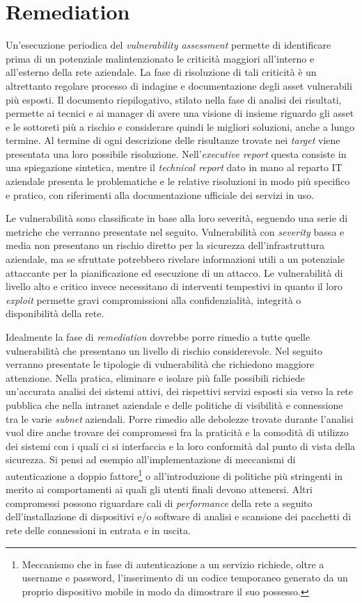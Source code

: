 \documentclass[target=bach,aauheader=]{thud}
\begin{document}
\section{Remediation}

Un’esecuzione periodica del \textit{vulnerability assessment} permette di identificare prima di un potenziale malintenzionato le criticità maggiori all’interno e all’esterno della rete aziendale. La fase di risoluzione di tali criticità è un altrettanto regolare processo di indagine e documentazione degli asset vulnerabili più esposti. Il documento riepilogativo, stilato nella fase di analisi dei risultati, permette ai tecnici e ai manager di avere una visione di insieme riguardo gli asset e le sottoreti più a rischio e considerare quindi le migliori soluzioni, anche a lungo termine. Al termine di ogni descrizione delle risultanze trovate nei \textit{target} viene presentata una loro possibile risoluzione. Nell’\textit{executive report} questa consiste in una spiegazione sintetica, mentre il \textit{technical report} dato in mano al reparto IT aziendale presenta le problematiche e le relative risoluzioni in modo più specifico e pratico, con riferimenti alla documentazione ufficiale dei servizi in uso.

Le vulnerabilità sono classificate in base alla loro severità, seguendo una serie di metriche che verranno presentate nel seguito. Vulnerabilità con \textit{severity} bassa e media non presentano un rischio diretto per la sicurezza dell’infrastruttura aziendale, ma se sfruttate potrebbero rivelare informazioni utili a un potenziale attaccante per la pianificazione ed esecuzione di un attacco. Le vulnerabilità di livello alto e critico invece necessitano di interventi tempestivi in quanto il loro \textit{exploit} permette gravi compromissioni alla confidenzialità, integrità o disponibilità della rete.

Idealmente la fase di \textit{remediation} dovrebbe porre rimedio a tutte quelle vulnerabilità che presentano un livello di rischio considerevole. Nel seguito verranno presentate le tipologie di vulnerabilità che richiedono maggiore attenzione. Nella pratica, eliminare e isolare più falle possibili richiede un’accurata analisi dei sistemi attivi, dei rispettivi servizi esposti sia verso la rete pubblica che nella intranet aziendale e delle politiche di visibilità e connessione tra le varie \textit{subnet} aziendali. Porre rimedio alle debolezze trovate durante l’analisi vuol dire anche trovare dei compromessi fra la praticità e la comodità di utilizzo dei sistemi con i quali ci si interfaccia e la loro conformità dal punto di vista della sicurezza. Si pensi ad esempio all’implementazione di meccanismi di autenticazione a doppio fattore\footnote{Meccanismo che in fase di autenticazione a un servizio richiede, oltre a username e password, l'inserimento di un codice temporaneo generato da un proprio dispositivo mobile in modo da dimostrare il suo possesso.} o all’introduzione di politiche più stringenti in merito ai comportamenti ai quali gli utenti finali devono attenersi. Altri compromessi possono riguardare cali di \textit{performance} della rete a seguito dell’installazione di dispositivi e/o software di analisi e scansione dei pacchetti di rete delle connessioni in entrata e in uscita.
\end{document}
